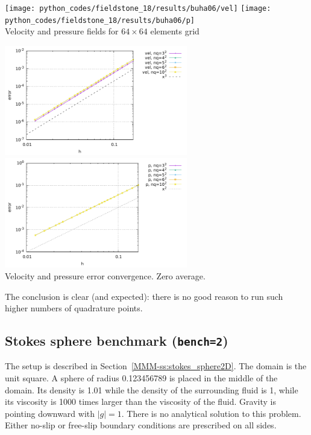 \begin{center}
\texttt{[image: python\_codes/fieldstone\_18/results/buha06/vel]}
\texttt{[image: python\_codes/fieldstone\_18/results/buha06/p]}\\
{\captionfont Velocity and pressure fields for $64\times 64$ elements grid}
\end{center}

\begin{center}
\includegraphics[width=8cm]{python_codes/fieldstone_18/results/buha06/errorsV}
\includegraphics[width=8cm]{python_codes/fieldstone_18/results/buha06/errorsP}\\
{\captionfont Velocity and pressure error convergence. Zero average.}
\end{center}

The conclusion is clear (and expected): there is no good reason 
to run such higher numbers of quadrature points.


\newpage
\subsection*{Stokes sphere benchmark ({\tt bench=2})}

The setup is described in Section~\ref{MMM-ss:stokes_sphere2D}.
The domain is the unit square.
A sphere of radius 0.123456789 is placed in the middle of the domain. 
Its density is 1.01 while the density of the surrounding fluid is 1,
while its viscosity is 1000 times larger than the viscosity of the fluid.
Gravity is pointing downward with $|g|=1$.
There is no analytical solution to this problem.
Either no-slip or free-slip boundary conditions are prescribed on all 
sides.

